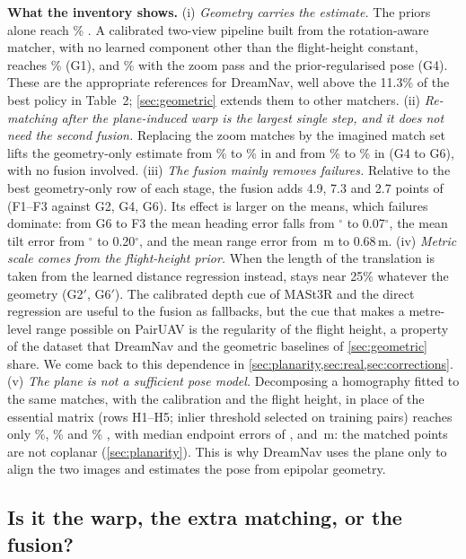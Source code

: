 \noindent\textbf{What the inventory shows.}
(i) \emph{Geometry carries the estimate.} The priors alone reach \priSRd\% \SRd{}. A calibrated two-view pipeline built from the rotation-aware matcher, with no learned component other than the flight-height constant, reaches \gOneSRd\% (G1), and \gFourSRd\% with the zoom pass and the prior-regularised pose (G4). These are the appropriate references for DreamNav, well above the 11.3\% of the best policy in Table~2; \cref{sec:geometric} extends them to other matchers.
(ii) \emph{Re-matching after the plane-induced warp is the largest single step, and it does not need the second fusion.} Replacing the zoom matches by the imagined match set lifts the geometry-only estimate from \gFourSRd\% to \gSixSRd\% in \SRd{} and from \gFourSRe\% to \gSixSRe\% in \SRe{} (G4 to G6), with no fusion involved.
(iii) \emph{The fusion mainly removes failures.} Relative to the best geometry-only row of each stage, the fusion adds 4.9, 7.3 and 2.7 points of \SRd{} (F1--F3 against G2, G4, G6). Its effect is larger on the means, which failures dominate: from G6 to F3 the mean heading error falls from \gSixTheta$^\circ$ to 0.07$^\circ$, the mean tilt error from \gSixPsi$^\circ$ to 0.20$^\circ$, and the mean range error from \gSixD\,m to 0.68\,m.
(iv) \emph{Metric scale comes from the flight-height prior.} When the length of the translation is taken from the learned distance regression instead, \SRd{} stays near 25\% whatever the geometry (G2$'$, G6$'$). The calibrated depth cue of MASt3R and the direct regression are useful to the fusion as fallbacks, but the cue that makes a metre-level range possible on PairUAV is the regularity of the flight height, a property of the dataset that DreamNav and the geometric baselines of \cref{sec:geometric} share. We come back to this dependence in \cref{sec:planarity,sec:real,sec:corrections}.
(v) \emph{The plane is not a sufficient pose model.} Decomposing a homography fitted to the same matches, with the calibration and the flight height, in place of the essential matrix (rows H1--H5; inlier threshold selected on training pairs) reaches only \hmOneSRd\%, \hmThreeSRd\% and \hmFiveSRd\% \SRd, with median endpoint errors of \hmOneEPEmed, \hmThreeEPEmed{} and \hmFiveEPEmed\,m: the matched points are not coplanar (\cref{sec:planarity}). This is why DreamNav uses the plane only to align the two images and estimates the pose from epipolar geometry.

\subsection{Is it the warp, the extra matching, or the fusion?}
\label{sec:controls}

